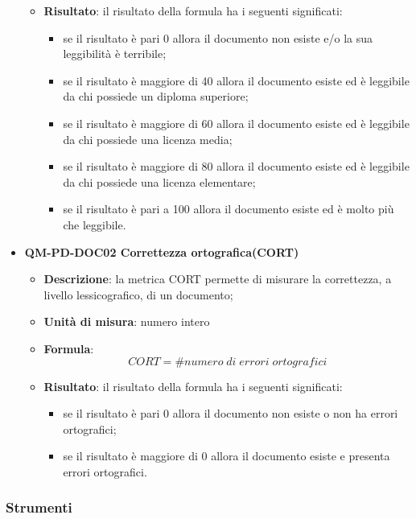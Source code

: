\begin{itemize}
\begin{itemize}
							\item\textbf{Risultato}: il risultato della formula ha i seguenti significati:
								\begin{itemize}
									\item se il risultato è pari 0 allora il documento non esiste e/o la sua leggibilità è terribile;
									\item se il risultato è maggiore di 40 allora il documento esiste ed è leggibile da chi possiede un diploma superiore;
									\item se il risultato è maggiore di 60 allora il documento esiste ed è leggibile da chi possiede una licenza media;
									\item se il risultato è maggiore di 80 allora il documento esiste ed è leggibile da chi possiede una licenza elementare;
									\item se il risultato è pari a 100 allora il documento esiste ed è molto più che leggibile.
								\end{itemize}
						\end{itemize}
					\item\textbf{QM-PD-DOC02 Correttezza ortografica(CORT)} 
						\begin{itemize}
							\item\textbf{Descrizione}: la metrica CORT permette di misurare la correttezza, a livello lessicografico, di un documento;
							\item\textbf{Unità di misura}: numero intero
							\item\textbf{Formula}: \\
								\[CORT = \# \mathit{numero\;di\;errori\;ortografici}\]
							\item\textbf{Risultato}: il risultato della formula ha i seguenti significati:
								\begin{itemize}
									\item se il risultato è pari 0 allora il documento non esiste o non ha errori ortografici;
									\item se il risultato è maggiore di 0 allora il documento esiste e presenta errori ortografici.
								\end{itemize}
						\end{itemize}
				\end{itemize}
		\subsubsection{Strumenti}

